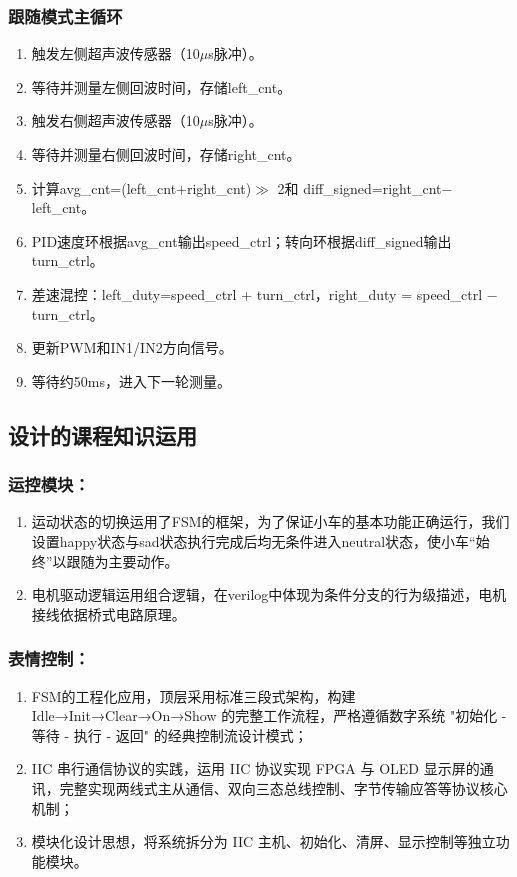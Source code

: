 \documentclass[12pt,a4paper]{ctexart}
\begin{document}
\subsubsection*{跟随模式主循环}

\begin{enumerate}
    \item 触发左侧超声波传感器（10$\mu$s脉冲）。
    \item 等待并测量左侧回波时间，存储left\_cnt。
    \item 触发右侧超声波传感器（10$\mu$s脉冲）。
    \item 等待并测量右侧回波时间，存储right\_cnt。
    \item 计算avg\_cnt=(left\_cnt+right\_cnt)$\gg$ 2和 diff\_signed=right\_cnt$-$left\_cnt。
    \item PID速度环根据avg\_cnt输出speed\_ctrl；转向环根据diff\_signed输出turn\_ctrl。
    \item 差速混控：left\_duty=speed\_ctrl + turn\_ctrl，right\_duty = speed\_ctrl $-$ turn\_ctrl。
    \item 更新PWM和IN1/IN2方向信号。
    \item 等待约50ms，进入下一轮测量。
\end{enumerate}

\subsection{设计的课程知识运用}
\subsubsection{运控模块：}
\begin{enumerate}
    \item 运动状态的切换运用了FSM的框架，为了保证小车的基本功能正确运行，我们设置happy状态与sad状态执行完成后均无条件进入neutral状态，使小车“始终”以跟随为主要动作。
    \item 电机驱动逻辑运用组合逻辑，在verilog中体现为条件分支的行为级描述，电机接线依据桥式电路原理。
\end{enumerate}

\subsubsection{表情控制：}
\begin{enumerate}
    \item FSM的工程化应用，顶层采用标准三段式架构，构建 Idle→Init→Clear→On→Show 的完整工作流程，严格遵循数字系统 "初始化 - 等待 - 执行 - 返回" 的经典控制流设计模式；
    \item IIC 串行通信协议的实践，运用 IIC 协议实现 FPGA 与 OLED 显示屏的通讯，完整实现两线式主从通信、双向三态总线控制、字节传输应答等协议核心机制；
    \item 模块化设计思想，将系统拆分为 IIC 主机、初始化、清屏、显示控制等独立功能模块。
\end{enumerate}
\end{document}
